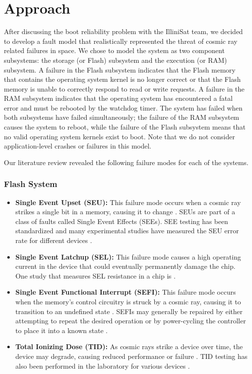\section{Approach}\label{sec:approach}

After discussing the boot reliability problem with the IlliniSat team, we decided to develop a fault model that realistically represented the threat of cosmic ray related failures in space.  We chose to model the system as two component subsystems: the storage (or Flash) subsystem and the execution (or RAM) subsystem.  A failure in the Flash subsystem indicates that the Flash memory that contains the operating system kernel is no longer correct or that the Flash memory is unable to correctly respond to read or write requests.  A failure in the RAM subsystem indicates that the operating system has encountered a fatal error and must be rebooted by the watchdog timer.  The system has failed when both subsystems have failed simultaneously; the failure of the RAM subsystem causes the system to reboot, while the failure of the Flash subsystem means that no valid operating system kernels exist to boot.  Note that we do not consider application-level crashes or failures in this model.

Our literature review revealed the following failure modes for each of the systems.

\subsubsection{Flash System}\label{sec:flashmodel}
\begin{itemize}
  \item {\bf Single Event Upset (SEU):} This failure mode occurs when a cosmic ray strikes a single bit in a memory, causing it to change \cite{Gerardin2010Present}.  SEUs are part of a class of faults called Single Event Effects (SEEs).  SEE testing has been standardized \cite{Schwank2013Radiation} and many experimental studies have measured the SEU error rate for different devices \cite{Langley2004SEE, Oldham2008TID}.
  \item {\bf Single Event Latchup (SEL):} This failure mode causes a high operating current in the device that could eventually permanently damage the chip.  One study that measures SEL resistance in a chip is \cite{Langley2004SEE}.
  \item {\bf Single Event Functional Interrupt (SEFI):} This failure mode occurs when the memory's control circuitry is struck by a cosmic ray, causing it to transition to an undefined state \cite{Langley2004SEE}.  SEFIs may generally be repaired by either attempting to repeat the desired operation or by power-cycling the controller to place it into a known state \cite{Gerardin2010Present}.
  \item {\bf Total Ionizing Dose (TID):} As cosmic rays strike a device over time, the device may degrade, causing reduced performance or failure \cite{Gerardin2010Present}.  TID testing has also been performed in the laboratory for various devices \cite{Oldham2008TID}.
\end{itemize}
